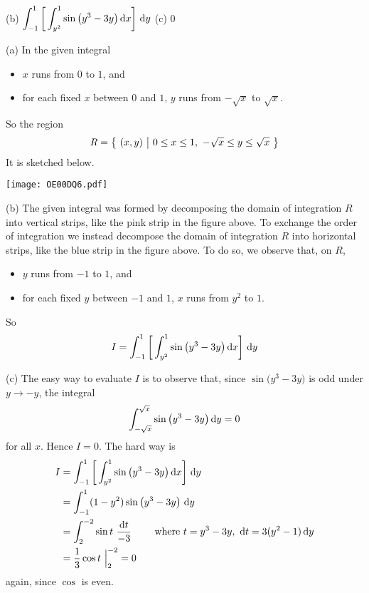 %

\begin{answer}

(b) $\displaystyle\int_{-1}^1\bigg[\int_{y^2}^1 \sin\big(y^3-3y\big)\,\mathrm{d}x\bigg]\ \mathrm{d}y$
\qquad (c) $0$
\end{answer}

\begin{solution}
(a) In the given integral
\begin{itemize}
\item
$x$ runs from $0$ to $1$, and
\item
for each fixed $x$ between $0$ and $1$,
$y$ runs from $-\sqrt{x}$ to $\sqrt{x}$.
\end{itemize}
So the region
\begin{equation*}
R=\big\{ \ (x,y)\ \big|\ 0\le x\le 1,\ -\sqrt{x}\le y\le \sqrt{x}\ \big\}
\end{equation*}
It is sketched below.
\begin{center}
     \texttt{[image: OE00DQ6.pdf]}
\end{center}

(b) The given integral was formed by decomposing
the domain of integration $R$ into vertical strips, like the pink strip
in the figure above. To exchange the order of integration we instead
decompose the domain of integration $R$ into horizontal strips, 
like the blue strip in the figure above. To do so, we observe that, on $R$,
\begin{itemize}
\item 
$y$ runs from $-1$ to $1$, and
\item
for each fixed $y$ between $-1$ and $1$, $x$ runs from $y^2$ to $1$.
\end{itemize}
So 
\begin{equation*}
I=\int_{-1}^1\bigg[\int_{y^2}^1 \sin\big(y^3-3y\big)\,\mathrm{d}x\bigg]\ \mathrm{d}y
\end{equation*}

(c) The easy way to evaluate $I$ is to observe that, since 
$\sin\big(y^3-3y\big)$ is odd under $y\rightarrow -y$, the integral
\begin{equation*}
\int_{-\sqrt{x}}^{\sqrt{x}} \sin\big(y^3-3y\big)\,\mathrm{d}y=0
\end{equation*}
for all $x$. Hence $I=0$. The hard way is 
\begin{align*}
I&=\int_{-1}^1\bigg[\int_{y^2}^1 \sin\big(y^3-3y\big)\,\mathrm{d}x\bigg]\ \mathrm{d}y\\
&=\int_{-1}^1 (1-y^2) \sin\big(y^3-3y\big)\ \mathrm{d}y\\
&=\int_2^{-2} \sin t\ \frac{\mathrm{d}t}{-3}
\qquad\hbox{ where }t=y^3-3y,\ \mathrm{d}t =3(y^2-1)\,\mathrm{d}y \\
&=\frac{1}{3}\cos t\ \Big|_2^{-2}=0
\end{align*}
again, since $\cos$ is even.
\end{solution}

